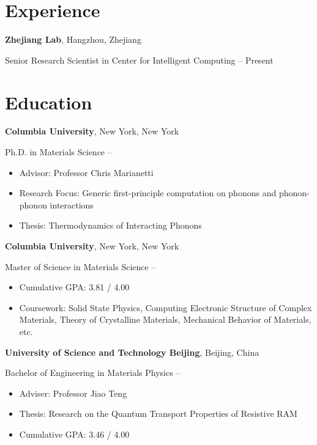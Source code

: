 \documentclass[
  a4paper,
  12pt
]{cv}
\author{Lyuwen Fu}
\begin{document}
\maketitle

\section{Experience}

{\textbf{Zhejiang Lab}},
Hangzhou, Zhejiang

Senior Research Scientist in
{Center for Intelligent Computing}
\hfill
{} --
Present

\section{Education}

{\textbf{Columbia University}},
New York, New York

Ph.D. in
{Materials Science}
\hfill
{} --
\begin{itemize}
\item Advisor: Professor Chris Marianetti
\item Research Focus: Generic first-principle computation on phonons and phonon-phonon interactions
\item Thesis: Thermodynamics of Interacting Phonons
\end{itemize}


{\textbf{Columbia University}},
New York, New York

Master of Science in
{Materials Science}
\hfill
{} --
\begin{itemize}
\item Cumulative GPA: 3.81 / 4.00
\item Coursework: Solid State Physics, Computing Electronic Structure of Complex Materials, Theory of Crystalline Materials, Mechanical Behavior of Materials, etc.
\end{itemize}


{\textbf{University of Science and Technology Beijing}},
Beijing, China

Bachelor of Engineering in
{Materials Physics}
\hfill
{} --
\begin{itemize}
\item Adviser: Professor Jiao Teng
\item Thesis: Research on the Quantum Transport Properties of Resistive RAM
\item Cumulative GPA: 3.46 / 4.00
\end{itemize}
\end{document}

